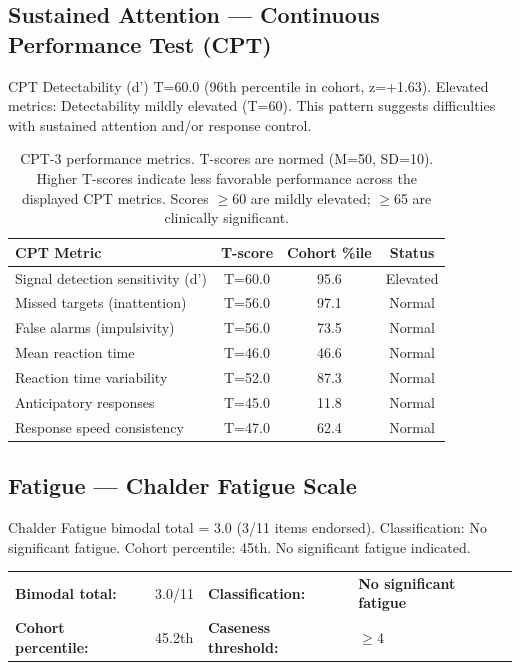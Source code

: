 \documentclass[11pt,a4paper]{article}
\begin{document}
\subsection{Sustained Attention --- Continuous Performance Test (CPT)}
CPT Detectability (d') T=60.0 (96th percentile in cohort, z=+1.63). Elevated metrics: Detectability mildly elevated (T=60). This pattern suggests difficulties with sustained attention and/or response control.

\begin{table}[H]
\centering\small
\begin{tabular}{lccc}
\toprule
\textbf{CPT Metric} & \textbf{T-score} & \textbf{Cohort \%ile} & \textbf{Status} \\
\midrule
    Signal detection sensitivity (d') & T=60.0 & 95.6 & \textcolor{clinamber}{Elevated} \\
    Missed targets (inattention) & T=56.0 & 97.1 & \textcolor{clingreen}{Normal} \\
    False alarms (impulsivity) & T=56.0 & 73.5 & \textcolor{clingreen}{Normal} \\
    Mean reaction time & T=46.0 & 46.6 & \textcolor{clingreen}{Normal} \\
    Reaction time variability & T=52.0 & 87.3 & \textcolor{clingreen}{Normal} \\
    Anticipatory responses & T=45.0 & 11.8 & \textcolor{clingreen}{Normal} \\
    Response speed consistency & T=47.0 & 62.4 & \textcolor{clingreen}{Normal} \\
\bottomrule
\end{tabular}
\caption{CPT-3 performance metrics. T-scores are normed (M=50, SD=10). Higher T-scores indicate less favorable performance across the displayed CPT metrics. Scores $\geq$60 are mildly elevated; $\geq$65 are clinically significant.}
\end{table}

\subsection{Fatigue --- Chalder Fatigue Scale}
Chalder Fatigue bimodal total = 3.0 (3/11 items endorsed). Classification: No significant fatigue. Cohort percentile: 45th. No significant fatigue indicated.

\noindent\begin{tabular}{llll}
\textbf{Bimodal total:} & 3.0/11 &
\textbf{Classification:} & \textbf{No significant fatigue} \\
\textbf{Cohort percentile:} & 45.2th &
\textbf{Caseness threshold:} & $\geq$4 \\
\end{tabular}
\end{document}
